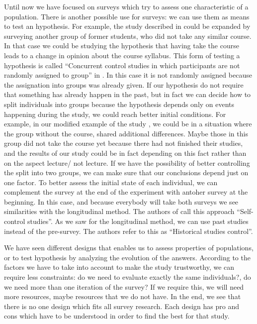 \documentclass{article}
\begin{document}
Until now we have focused on surveys which try to assess one characteristic of a population. There is another possible use for surveys: we can use them as means to test an hypothesis.
For example, the study described in \cite{DBLP:dblp_conf/er/TortOP13} could be expanded by surveying another group of former students, who did not take any similar course. In that case we could be studying the hypothesis that having take the course leads to a change in opinion about the course syllabus. This form of testing a hypothesis is  called “Concurrent control studies in which participants are not randomly assigned to group” in \cite{Kitchenham2002}. In this case it is not randomly assigned because the assignation into groups was already given.
If our hypothesis do not require that something has already happen in the past, but in fact we can decide how to split individuals into groups because the hypothesis depends only on events happening during the study, we could reach better initial conditions. For example, in our modified example of the study \cite{DBLP:dblp_conf/er/TortOP13}, we could be in a situation where the group without the course, shared additional differences. Maybe those in this group did not take the course yet because there had not finished their studies, and the results of our study could be in fact depending on this fact rather than on the aspect lecture/ not lecture. If we have the possibility of better controlling the split into two groups, we can make sure that our conclusions depend just on one factor.
To better assess the initial state of each individual, we can complement the survey at the end of the experiment with antoher survey at the beginning. In this case, and because everybody will take both surveys we see similarities with the longitudinal method. The authors of \cite{Kitchenham2002} call this approach “Self-control studies”. As we saw for the longitudinal method, we can use past studies instead of the pre-survey. The authors refer to this as “Historical studies control”.

We have seen different designs that enables us to assess properties of populations, or to test hypothesis by analyzing the evolution of the answers. According to the factors we have to take into account to make the study trustworthy, we can require less constraints: do we need to evaluate exactly the same individuals?, do we need more than one iteration of the survey? If we require this, we will need more resources, maybe resources that we do not have. In the end, we see that there is no one design which fits all survey research. Each design has pro and cons which have to be understood in order to find the best for that study.
\end{document}
